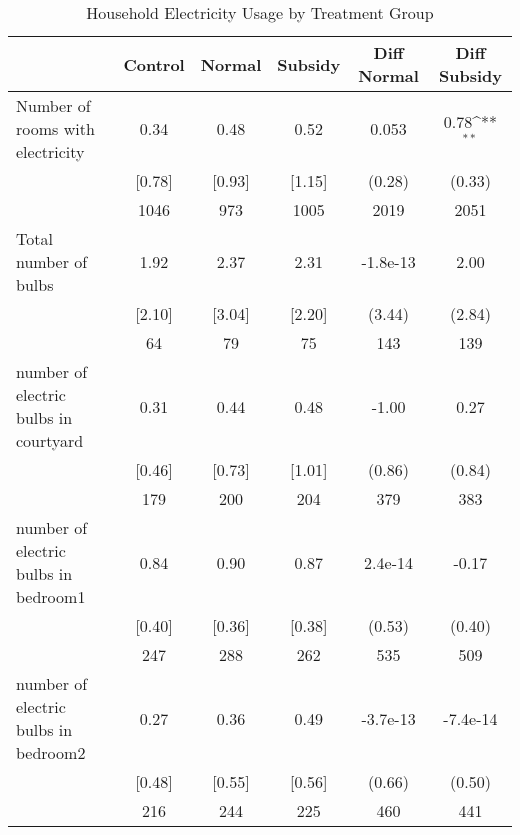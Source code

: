 \begin{table}[htbp]\centering
\def\sym#1{\ifmmode^{#1}\else\(^{#1}\)\fi}
\caption{Household Electricity Usage by Treatment Group \label{tab:"balance"}}
\begin{tabular*}{0.9\hsize}{@{\hskip\tabcolsep\extracolsep\fill}l*{1}{ccccc}}
\toprule
                                &  Control&   Normal&  Subsidy&Diff Normal         &Diff Subsidy         \\
\midrule
Number of rooms with electricity&     0.34&     0.48&     0.52&    0.053         &     0.78\sym{**} \\
                                &   [0.78]&   [0.93]&   [1.15]&   (0.28)         &   (0.33)         \\
                                &     1046&      973&     1005&     2019         &     2051         \\
Total number of bulbs           &     1.92&     2.37&     2.31& -1.8e-13         &     2.00         \\
                                &   [2.10]&   [3.04]&   [2.20]&   (3.44)         &   (2.84)         \\
                                &       64&       79&       75&      143         &      139         \\
number of electric bulbs in courtyard&     0.31&     0.44&     0.48&    -1.00         &     0.27         \\
                                &   [0.46]&   [0.73]&   [1.01]&   (0.86)         &   (0.84)         \\
                                &      179&      200&      204&      379         &      383         \\
number of electric bulbs in bedroom1&     0.84&     0.90&     0.87&  2.4e-14         &    -0.17         \\
                                &   [0.40]&   [0.36]&   [0.38]&   (0.53)         &   (0.40)         \\
                                &      247&      288&      262&      535         &      509         \\
number of electric bulbs in bedroom2&     0.27&     0.36&     0.49& -3.7e-13         & -7.4e-14         \\
                                &   [0.48]&   [0.55]&   [0.56]&   (0.66)         &   (0.50)         \\
                                &      216&      244&      225&      460         &      441         \\

\end{tabular*}
\end{table}
